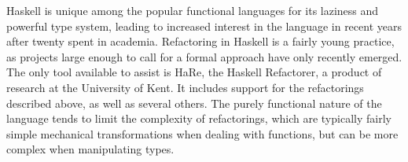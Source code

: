\documentclass{article}
\begin{document}
Haskell is unique among the popular functional languages for its laziness and powerful type system, leading to increased interest in the language in recent years after twenty spent in academia.
Refactoring in Haskell is a fairly young practice, as projects large enough to call for a formal approach have only recently emerged.
The only tool available to assist is HaRe, the Haskell Refactorer\cite{li2006refactoring}, a product of research at the University of Kent.
It includes support for the refactorings described above, as well as several others.
The purely functional nature of the language tends to limit the complexity of refactorings, which are typically fairly simple mechanical transformations when dealing with functions, but can be more complex when manipulating types.




\end{document}
